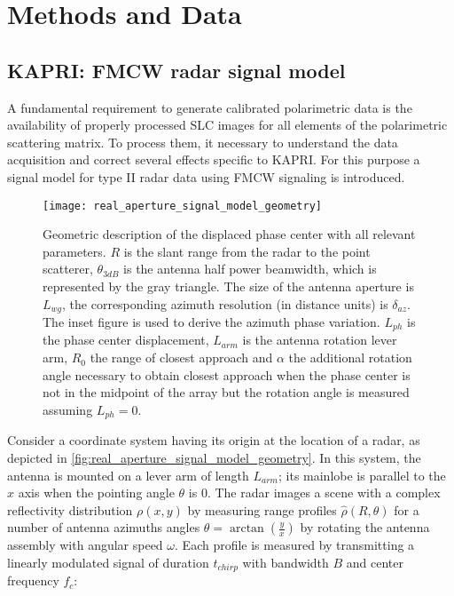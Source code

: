 \section{Methods and Data}\label{sec:methods}
\subsection{KAPRI: FMCW radar signal model}\label{sec:methods:signal_model}
A fundamental requirement to generate calibrated polarimetric data is the availability of properly processed SLC images for all elements of the polarimetric scattering matrix. To process them, it necessary to understand the data acquisition and correct several effects specific to KAPRI.  
For this purpose a signal model for type II\cite{Caduff2015} radar data using FMCW signaling\cite{Stove1992} is introduced.\\
\begin{figure}[h]
	\centering
	\texttt{[image: real\_aperture\_signal\_model\_geometry]}
	\caption{Geometric description of the displaced phase center with all relevant parameters. $R$ is the slant range from the radar to the point scatterer, $\theta_{3dB}$ is the antenna half power beamwidth, which is represented by the gray triangle. The size of the antenna aperture is $L_{wg}$, the corresponding azimuth resolution (in distance units) is $\delta_{az}$. The inset figure is used to derive the azimuth phase variation. $L_{ph}$ is the phase center displacement, $L_{arm}$ is the antenna rotation lever arm, $R_{0}$ the range of closest approach and $\alpha$ the additional rotation angle necessary to obtain closest approach when the phase center is not in the midpoint of the array but the rotation angle is measured assuming $L_{ph}=0$.}
	\label{fig:real_aperture_signal_model_geometry}
\end{figure}
Consider a coordinate system having its origin at the location of a radar, as depicted in \autoref{fig:real_aperture_signal_model_geometry}. In this system, the antenna is mounted on a lever arm of length $L_{arm}$; its mainlobe is parallel to the $x$ axis when the pointing angle $\theta$ is 0. The radar images a scene with a complex reflectivity distribution $\rho\left(x,y\right)$ by measuring range profiles $\hat{\rho}\left(R, \theta\right)$ for a number of antenna azimuths angles $\theta = \operatorname{arctan}\left(\frac{y}{x}\right)$ by rotating the antenna assembly with angular speed $\omega$. Each profile is measured by transmitting a linearly modulated signal of duration $t_{chirp}$ with bandwidth $B$ and center frequency $f_c$:

